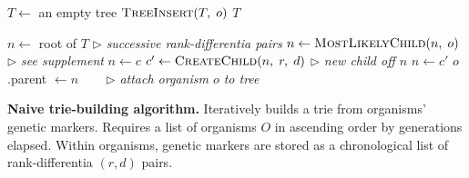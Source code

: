 \begin{algorithm}[h]
    \begin{algorithmic}[1]
    \small{
            \State $T \gets$ an empty tree
                \State $\textsc{TreeInsert}(T,\; o)$
            \EndFor
            \State \Return $T$
        \EndFunction

            \State $n \gets$ root of $T$
             \text{ } $\triangleright$ \textit{successive rank-differentia pairs}
                \State $n \gets \textsc{MostLikelyChild}(n,\; o)$ \text{ } $\triangleright$ \textit{see supplement}
                    \State $n \gets c$
                \Else
                    \State $c' \gets \textsc{CreateChild}(n,\; r,\; d)$ \text{ } $\triangleright$ \textit{new child off $n$}
                    \State $n \gets c'$
                \EndIf
            \EndFor
            \State $o$.parent $\gets n$ ~~~ $\triangleright$ \textit{attach organism $o$ to tree}
        \EndFunction
    }
    \end{algorithmic}
    \caption{\textbf{Naive trie-building algorithm.} \small Iteratively builds a trie from organisms' genetic markers. Requires a list of organisms $O$ in ascending order by generations elapsed. Within organisms, genetic markers are stored as a chronological list of rank-differentia $(r, d)$ pairs. \vspace{-1.5em}}
    \label{alg:old}
\end{algorithm}
